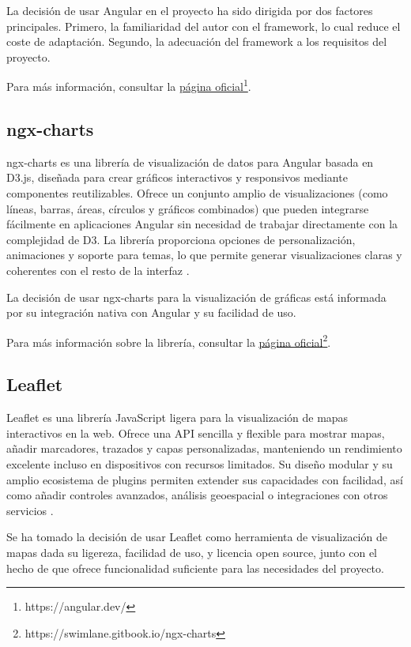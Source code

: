La decisión de usar Angular en el proyecto ha sido dirigida por dos factores principales. Primero, la familiaridad del autor con el framework, lo cual reduce el coste de adaptación. Segundo, la adecuación del framework a los requisitos del proyecto.

\noindent Para más información, consultar la \href{https://angular.dev/}{\uline{página oficial}\footnote{\url{https://angular.dev/}}}.


\subsection{ngx-charts}
ngx-charts es una librería de visualización de datos para Angular basada en D3.js, diseñada para crear gráficos interactivos y responsivos mediante componentes reutilizables. Ofrece un conjunto amplio de visualizaciones (como líneas, barras, áreas, círculos y gráficos combinados) que pueden integrarse fácilmente en aplicaciones Angular sin necesidad de trabajar directamente con la complejidad de D3. La librería proporciona opciones de personalización, animaciones y soporte para temas, lo que permite generar visualizaciones claras y coherentes con el resto de la interfaz \cite{ngxcharts}. 

La decisión de usar ngx-charts para la visualización de gráficas está informada por su integración nativa con Angular y su facilidad de uso.

\noindent Para más información sobre la librería, consultar la \href{https://swimlane.gitbook.io/ngx-charts}{\uline{página oficial}\footnote{\url{https://swimlane.gitbook.io/ngx-charts}}}.

\subsection{Leaflet}
Leaflet es una librería JavaScript ligera para la visualización de mapas interactivos en la web. Ofrece una API sencilla y flexible para mostrar mapas, añadir marcadores, trazados y capas personalizadas, manteniendo un rendimiento excelente incluso en dispositivos con recursos limitados. Su diseño modular y su amplio ecosistema de plugins permiten extender sus capacidades con facilidad, así como añadir controles avanzados, análisis geoespacial o integraciones con otros servicios \cite{leaflet}. 

Se ha tomado la decisión de usar Leaflet como herramienta de visualización de mapas dada su ligereza, facilidad de uso, y licencia open source, junto con el hecho de que ofrece funcionalidad suficiente para las necesidades del proyecto.

